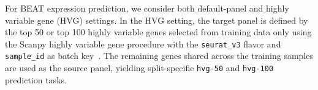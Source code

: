 For BEAT expression prediction, we consider both default-panel and highly variable gene (HVG) settings. In the HVG setting, the target panel is defined by the top 50 or top 100 highly variable genes selected from training data only using the Scanpy highly variable gene procedure with the \texttt{seurat\_v3} flavor and \texttt{sample\_id} as batch key~\cite{wolf_scanpylargescalesinglecell_2018}. The remaining genes shared across the training samples are used as the source panel, yielding split-specific \texttt{hvg-50} and \texttt{hvg-100} prediction tasks.
